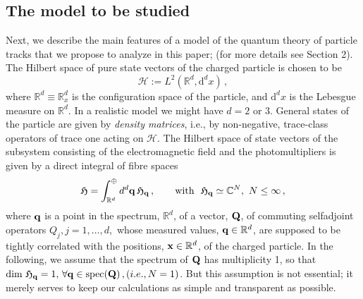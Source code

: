 \documentclass[12pt]{article}
\renewcommand{\d}{{\mathrm d}}
\begin{document}
\subsection{The model to be studied}\label{mod}
Next, we describe the main features of a model of the quantum theory of particle tracks that we propose to analyze in this paper; (for more details see Section 2). The Hilbert space of pure state vectors of the charged particle is chosen to be
\begin{equation}\label{Hilbert}
\mathcal{H}:= L^{2}(\mathbb{R}^{d}, \d^{d}x)\,,
\end{equation}
where $\mathbb{R}^{d}\equiv \mathbb{R}^{d}_{x}$ is the configuration space of the particle, and $\d^{d}x$ 
is the Lebesgue measure on $\mathbb{R}^{d}$. In a realistic model we might have $d=2$ or $3$.
General states of the particle are given by \textit{density matrices}, i.e., by non-negative, trace-class 
operators of trace one acting on $\mathcal{H}$. The Hilbert space of state vectors of the subsystem consisting of the electromagnetic field and the photomultipliers is given by a direct integral of fibre spaces 
$$\mathfrak{H} = \int^{\oplus}_{\mathbb{R}^{d}} d^{d}{\bf{q}}\, \mathfrak{H}_{{\bf{q}}}\,, \qquad \text{with  }\,\, 
\mathfrak{H}_{{\bf{q}}} \simeq \mathbb{C}^{N}, \, \, N\leq \infty\,,$$ 
where ${\bf{q}}$ is a point in the spectrum, $\mathbb{R}^{d}$, of a vector, ${\bf{Q}}$, of commuting selfadjoint operators $Q_{j}, j=1,\dots,d,$ whose measured values, ${\bf{q}} \in \mathbb{R}^{d}$, are supposed to be tightly correlated 
with the positions, ${\bf{x}} \in \mathbb{R}^{d}$, of the charged particle. In the following, we assume that the spectrum of 
${\bf{Q}}$ has multiplicity 1, so that $\text{dim } \mathfrak{H}_{{\bf{q}}} = 1, \, \forall {\bf{q}} \in \text{spec}({\bf{Q}})\,, (i.e., 
N=1)$. But this assumption is not essential; it merely serves to keep our calculations as simple and transparent as possible.
\end{document}
